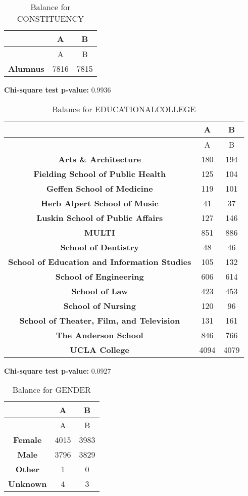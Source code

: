 \documentclass[
]{article}
\begin{document}
\begin{longtable}[]{@{}ccc@{}}
\caption{Balance for CONSTITUENCY}\tabularnewline
\toprule\noalign{}
~ & A & B \\
\midrule\noalign{}
\endfirsthead
\toprule\noalign{}
~ & A & B \\
\midrule\noalign{}
\endhead
\bottomrule\noalign{}
\endlastfoot
\textbf{Alumnus} & 7816 & 7815 \\
\end{longtable}

\textbf{Chi-square test p-value:} 0.9936\\
\pagebreak

\begin{longtable}[]{@{}ccc@{}}
\caption{Balance for EDUCATIONALCOLLEGE}\tabularnewline
\toprule\noalign{}
~ & A & B \\
\midrule\noalign{}
\endfirsthead
\toprule\noalign{}
~ & A & B \\
\midrule\noalign{}
\endhead
\bottomrule\noalign{}
\endlastfoot
\textbf{Arts \& Architecture} & 180 & 194 \\
\textbf{Fielding School of Public Health} & 125 & 104 \\
\textbf{Geffen School of Medicine} & 119 & 101 \\
\textbf{Herb Alpert School of Music} & 41 & 37 \\
\textbf{Luskin School of Public Affairs} & 127 & 146 \\
\textbf{MULTI} & 851 & 886 \\
\textbf{School of Dentistry} & 48 & 46 \\
\textbf{School of Education and Information Studies} & 105 & 132 \\
\textbf{School of Engineering} & 606 & 614 \\
\textbf{School of Law} & 423 & 453 \\
\textbf{School of Nursing} & 120 & 96 \\
\textbf{School of Theater, Film, and Television} & 131 & 161 \\
\textbf{The Anderson School} & 846 & 766 \\
\textbf{UCLA College} & 4094 & 4079 \\
\end{longtable}

\textbf{Chi-square test p-value:} 0.0927\\
\pagebreak

\begin{longtable}[]{@{}ccc@{}}
\caption{Balance for GENDER}\tabularnewline
\toprule\noalign{}
~ & A & B \\
\midrule\noalign{}
\endfirsthead
\toprule\noalign{}
~ & A & B \\
\midrule\noalign{}
\endhead
\bottomrule\noalign{}
\endlastfoot
\textbf{Female} & 4015 & 3983 \\
\textbf{Male} & 3796 & 3829 \\
\textbf{Other} & 1 & 0 \\
\textbf{Unknown} & 4 & 3 \\
\end{longtable}
\end{document}
